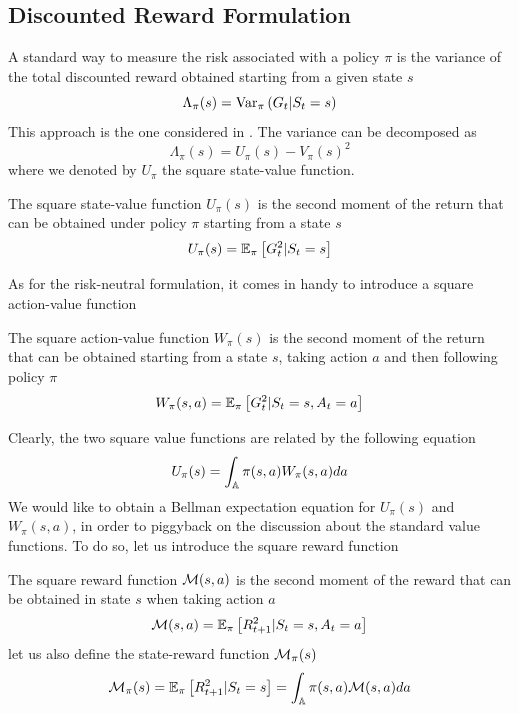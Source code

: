 \subsection{Discounted Reward Formulation}
A standard way to measure the risk associated with a policy $\pi$ is the variance of the total discounted reward obtained starting from a given state $s$
\begin{equation}
	\Lambda_\pi(s) = \Var[\pi]{G_t | S_t = s}
\end{equation}
This approach is the one considered in \cite{sobel1982variance}. The variance can be decomposed as 
\begin{equation}
	\label{eq:variance_decomposition}
	\Lambda_\pi(s) = U_\pi(s) - V_\pi(s)^2
\end{equation}
where we denoted by $U_\pi$ the square state-value function.
\begin{definition}
	The square state-value function $U_\pi(s)$ is the second moment of the return that can be obtained under policy $\pi$ starting from a state $s$ 
	\begin{equation}
		U_\pi(s) = \E[\pi]{G_t^2 | S_t = s}
	\end{equation}
\end{definition}
As for the risk-neutral formulation, it comes in handy to introduce a square action-value function
\begin{definition}
	The square action-value function $W_\pi(s)$ is the second moment of the return that can be obtained starting from a state $s$, taking action $a$ and then following policy $\pi$
	\begin{equation}
		W_\pi(s, a) = \E[\pi]{G_t^2 | S_t = s, A_t = a}
	\end{equation}
\end{definition}
Clearly, the two square value functions are related by the following equation
\begin{equation}
	U_\pi(s) = \int_{\A} \pi(s,a) W_\pi(s,a) da
\end{equation}
We would like to obtain a Bellman expectation equation for $U_\pi(s)$ and $W_\pi(s,a)$, in order to piggyback on the discussion about the standard value functions. To do so, let us introduce the square reward function 
\begin{definition}
	The square reward function $\calM(s,a)$ is the second moment of the reward that can be obtained in state $s$ when taking action $a$
	\begin{equation}
		\calM(s,a) = \E[\pi]{R_{t+1}^2 | S_t = s, A_t = a}
	\end{equation}
	let us also define the state-reward function $\calM_\pi(s)$ 
	\begin{equation}
		\calM_\pi(s) = \E[\pi]{R_{t+1}^2|S_t = s} = \int_\A \pi(s,a) \calM(s,a) da
	\end{equation}
\end{definition}
